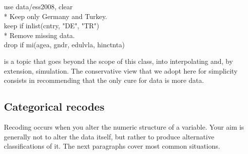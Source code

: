 	\begin{docspec}
		use data/ess2008, clear\\
		* Keep only Germany and Turkey.\\
		keep if inlist(cntry, "DE", "TR")\\
		* Remove missing data.\\
		drop if mi(agea, gndr, edulvla, hinctnta)
	\end{docspec}
	
	 is a topic that goes beyond the scope of this class, into interpolating and, by extension, simulation. The conservative view that we adopt here for simplicity consists in recommending that the only cure for data is more data.


%
%
%
\subsection{Categorical recodes}
\label{sec:categorical-recodes}

Recoding occurs when you alter the numeric structure of a variable. Your aim is generally not to alter the data itself, but rather to produce alternative classifications of it. The next paragraphs cover most common situations.

